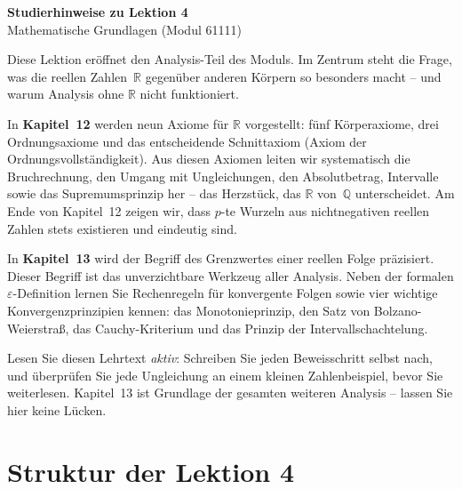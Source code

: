 \documentclass[a4paper,12pt]{article}
\begin{document}
\begin{center}
  {\LARGE\bfseries Studierhinweise zu Lektion 4}\\[0.5em]
  {\large Mathematische Grundlagen (Modul 61111)}
\end{center}

\vspace{1em}

Diese Lektion eröffnet den Analysis-Teil des Moduls. Im Zentrum steht die Frage,
was die reellen Zahlen~$\mathbb{R}$ gegenüber anderen Körpern so besonders macht -- und
warum Analysis ohne $\mathbb{R}$ nicht funktioniert.

In \textbf{Kapitel~12} werden neun Axiome für $\mathbb{R}$ vorgestellt: fünf Körperaxiome,
drei Ordnungsaxiome und das entscheidende Schnittaxiom (Axiom der Ordnungsvollständigkeit).
Aus diesen Axiomen leiten wir systematisch die Bruchrechnung, den Umgang mit Ungleichungen,
den Absolutbetrag, Intervalle sowie das Supremumsprinzip her -- das Herzstück, das
$\mathbb{R}$ von~$\mathbb{Q}$ unterscheidet. Am Ende von Kapitel~12 zeigen wir, dass
$p$-te Wurzeln aus nichtnegativen reellen Zahlen stets existieren und eindeutig sind.

In \textbf{Kapitel~13} wird der Begriff des Grenzwertes einer reellen Folge
präzisiert. Dieser Begriff ist das unverzichtbare Werkzeug aller Analysis. Neben
der formalen $\varepsilon$-Definition lernen Sie Rechenregeln für konvergente Folgen
sowie vier wichtige Konvergenzprinzipien kennen: das Monotonieprinzip, den Satz
von Bolzano-Weierstraß, das Cauchy-Kriterium und das Prinzip der Intervallschachtelung.

Lesen Sie diesen Lehrtext \emph{aktiv}: Schreiben Sie jeden Beweisschritt selbst nach,
und überprüfen Sie jede Ungleichung an einem kleinen Zahlenbeispiel, bevor Sie weiterlesen.
Kapitel~13 ist Grundlage der gesamten weiteren Analysis -- lassen Sie hier keine Lücken.

\section*{Struktur der Lektion 4}
\end{document}
